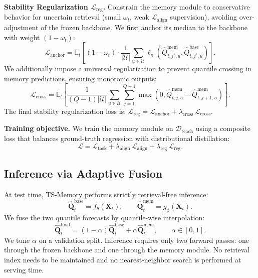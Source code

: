 \noindent\textbf{Stability Regularization $\mathcal{L}_{\text{reg}}$.} Constrain the memory module to conservative behavior for uncertain retrieval (small $\omega_t$, weak $\mathcal{L}_{\text{align}}$ supervision), avoiding over-adjustment of the frozen backbone. We first anchor its median to the backbone with weight $(1-\omega_t)$:
\begin{equation}
\mathcal{L}_{\text{anchor}} = \mathbb{E}_{t}\!\left[(1-\omega_t)\cdot\frac{1}{|\mathcal{U}|}\sum_{u\in\mathcal{U}}\ell_{\kappa}\!\left(\widehat{Q}^{\text{mem}}_{t,j^\star,u},\widehat{Q}^{\text{base}}_{t,j^\star,u}\right)\right].
\label{eq:tsm-loss-anchor}
\end{equation}
We additionally impose a universal regularization to prevent quantile crossing in memory predictions, ensuring monotonic outputs:
\begin{equation}
\mathcal{L}_{\text{cross}} = \mathbb{E}_{t}\!\left[\frac{1}{(Q-1)|\mathcal{U}|}\sum_{u\in\mathcal{U}}\sum_{j=1}^{Q-1}\max\!\left(0,\widehat{Q}^{\text{mem}}_{t,j,u}-\widehat{Q}^{\text{mem}}_{t,j+1,u}\right)\right].
\label{eq:tsm-loss-cross}
\end{equation}
The final stability regularization loss is: $\mathcal{L}_{\text{reg}}=\mathcal{L}_{\text{anchor}}+\lambda_{\text{cross}}\,\mathcal{L}_{\text{cross}}$.

\noindent\textbf{Training objective.}
We train the memory module on $\mathcal{D}_{\text{teach}}$ using a composite loss that balances ground-truth regression with distributional distillation:
\begin{equation}
\mathcal{L} = \mathcal{L}_{\text{task}} + \lambda_{\text{align}}\,\mathcal{L}_{\text{align}} + \lambda_{\text{reg}}\,\mathcal{L}_{\text{reg}}.
\label{eq:tsm-loss-total}
\end{equation}

\subsection{Inference via Adaptive Fusion}
\label{sec:inference}

At test time, TS-Memory performs strictly retrieval-free inference:
\begin{equation}
\widehat{\mathbf{Q}}^{\text{base}}_t=f_{\theta}(\mathbf{X}_t),
\qquad
\widehat{\mathbf{Q}}^{\text{mem}}_t=g_{\phi}(\mathbf{X}_t).
\label{eq:tsm-infer}
\end{equation}
We fuse the two quantile forecasts by quantile-wise interpolation:
\begin{equation}
\widehat{\mathbf{Q}}^{\text{final}}_t
=(1-\alpha)\widehat{\mathbf{Q}}^{\text{base}}_t+\alpha\widehat{\mathbf{Q}}^{\text{mem}}_t,
\qquad
\alpha\in[0,1].
\label{eq:tsm-fuse}
\end{equation}
We tune $\alpha$ on a validation split.
Inference requires only two forward passes: one through the frozen backbone and one through the memory module.
No retrieval index needs to be maintained and no nearest-neighbor search is performed at serving time.

